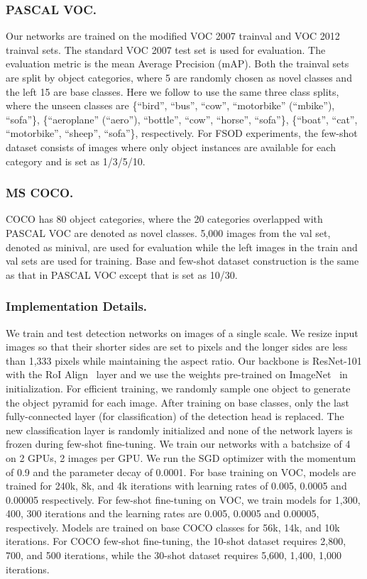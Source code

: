 \documentclass[runningheads]{llncs}
\begin{document}
\subsubsection{PASCAL VOC.}
Our networks are trained on the modified VOC 2007 trainval and VOC 2012 trainval sets. 
The standard VOC 2007 test set is used for evaluation. 
The evaluation metric is the mean Average Precision (mAP). 
Both the trainval sets are split by object categories, where 5 are randomly chosen as novel classes and the left 15 are base classes. 
Here we follow \cite{yolore} to use the same three class splits, where the unseen classes are \{``bird'', ``bus'', ``cow'', ``motorbike'' (``mbike''), ``sofa''\}, \{``aeroplane'' (``aero''), ``bottle'', ``cow'', ``horse'', ``sofa''\}, \{``boat'', ``cat'', ``motorbike'', ``sheep'', ``sofa''\}, respectively. 
For FSOD experiments, the few-shot dataset consists of images where only  object instances are available for each category and  is set as 1/3/5/10. 

\subsubsection{MS COCO.}
COCO has 80 object categories, where the 20 categories overlapped with PASCAL VOC are denoted as novel classes. 
5,000 images from the val set, denoted as minival, are used for evaluation while the left images in the train and val sets are used for training. 
Base and few-shot dataset construction is the same as that in PASCAL VOC except that  is set as 10/30. 

\subsubsection{Implementation Details.}
We train and test detection networks on images of a single scale. 
We resize input images so that their shorter sides are set to  pixels and the longer sides are less than 1,333 pixels while maintaining the aspect ratio. 
Our backbone is ResNet-101 \cite{resnet} with the RoI Align~\cite{maskrcnn} layer and we use the weights pre-trained on ImageNet~\cite{imagenet} in initialization.
For efficient training, we randomly sample one object to generate the object pyramid for each image. 
After training on base classes, only the last fully-connected layer (for classification) of the detection head is replaced. 
The new classification layer is randomly initialized and none of the network layers is frozen during few-shot fine-tuning. 
We train our networks with a batchsize of 4 on 2 GPUs, 2 images per GPU. We run the SGD optimizer with the momentum of 0.9 and the parameter decay of 0.0001. 
For base training on VOC, models are trained for 240k, 8k, and 4k iterations with learning rates of 0.005, 0.0005 and 0.00005 respectively. 
For few-shot fine-tuning on VOC, we train models for 1,300, 400, 300 iterations and the learning rates are 0.005, 0.0005 and 0.00005, respectively. 
Models are trained on base COCO classes for 56k, 14k, and 10k iterations.
For COCO few-shot fine-tuning, the 10-shot dataset requires 2,800, 700, and 500 iterations, while the 30-shot dataset requires 5,600, 1,400, 1,000 iterations.
\end{document}
